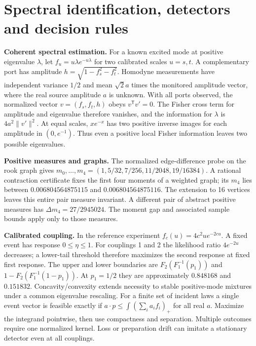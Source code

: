 \documentclass[
  10pt,
  a4paper,
]{article}
\begin{document}
\newpage

\section{Spectral identification, detectors and decision rules}\label{spectral-identification-detectors-and-decision-rules}

\textbf{Coherent spectral estimation.} For a known excited mode at positive eigenvalue \(\lambda\), let \(f_u=u\lambda e^{-u\lambda}\) for two calibrated scales \(u=s,t\). A complementary port has amplitude \(h=\sqrt{1-f_s^2-f_t^2}\). Homodyne measurements have independent variance \(1/2\) and mean \(\sqrt2 a\) times the monitored amplitude vector, where the real source amplitude \(a\) is unknown. With all ports observed, the normalized vector \(v=(f_s,f_t,h)\) obeys \(v^\mathsf T v'=0\). The Fisher cross term for amplitude and eigenvalue therefore vanishes, and the information for \(\lambda\) is \(4a^2\|v'\|^2\). At equal scales, \(x e^{-x}\) has two positive inverse images for each amplitude in \((0,e^{-1})\). Thus even a positive local Fisher information leaves two possible eigenvalues.

\textbf{Positive measures and graphs.} The normalized edge-difference probe on the rook graph gives \(m_0,\ldots,m_4=(1,5/32,7/256,11/2048,19/16384)\). A rational contraction certificate fixes the first four moments of a weighted graph; its \(m_4\) lies between \(0.006804564875115\) and \(0.006804564875116\). The extension to 16 vertices leaves this entire pair measure invariant. A different pair of abstract positive measures has \(\Delta m_4=27/2945024\). The moment gap and associated sample bounds apply only to those measures.

\textbf{Calibrated coupling.} In the reference experiment \(f_c(u)=4c^2u e^{-2cu}\). A fixed event has response \(0\le\eta\le1\). For couplings 1 and 2 the likelihood ratio \(4e^{-2u}\) decreases; a lower-tail threshold therefore maximizes the second response at fixed first response. The upper and lower boundaries are \(F_2(F_1^{-1}(p_1))\) and \(1-F_2(F_1^{-1}(1-p_1))\). At \(p_1=1/2\) they are approximately \(0.848168\) and \(0.151832\). Concavity/convexity extends necessity to stable positive-mode mixtures under a common eigenvalue rescaling. For a finite set of incident laws a single event vector is feasible exactly if \(a\cdot p\le\int(\sum_i a_i f_i)_+\) for all real \(a\). Maximize the integrand pointwise, then use compactness and separation. Multiple outcomes require one normalized kernel. Loss or preparation drift can imitate a stationary detector even at all couplings.
\end{document}
